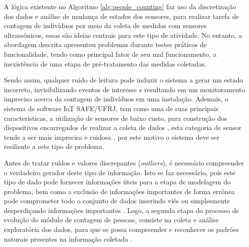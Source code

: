 A lógica existente no Algoritmo \ref{alg:people_counting} faz uso da discretização dos dados e análise de mudança de estados dos sensores, para realizar tarefa de contagem de indivíduos por meio da coleta de medidas com sensores ultrassônicos, essas são ideias centrais para este tipo de atividade. No entanto, a abordagem descrita apresentou problemas durante testes práticos de funcionalidade, tendo como principal fator de seu mal funcionamento, a inexistência de uma etapa de pré-tratamento das medidas coletadas. 

Sendo assim, qualquer ruído de leitura pode induzir o sistema a gerar um estado incorreto, invisibilizando eventos de interesse e resultando em um monitoramento impreciso acerca da contagem de indivíduos em uma instalação. Ademais, o sistema de software IoT SAFE/UFRJ, tem como uma de suas principais características, a utilização de sensores de baixo custo, para construção dos dispositivos encarregados de realizar a coleta de dados \cite{SAFE-IOT}, esta categoria de sensor tende a ser mais imprecisa e ruidosa \cite{Komorowski2016}, por este motivo o sistema deve ser resiliente a este tipo de problema.

Antes de tratar ruídos e valores discrepantes (\textit{outliers}), é necessário compreender o verdadeiro gerador deste tipo de informação. Isto se faz necessário, pois este tipo de dado pode fornecer informações úteis para a etapa de modelagem do problema, bem como a exclusão de informações importantes de forma errônea pode comprometer todo o conjunto de dados inserindo viés ou simplesmente desperdiçando informações importantes \cite{Komorowski2016}. Logo, a segunda etapa do processo de evolução do módulo de contagem de pessoas, consiste na coleta e análise exploratória dos dados, para que se possa compreender e reconhecer os padrões naturais presentes na informação coletada \cite{Komorowski2016}.


